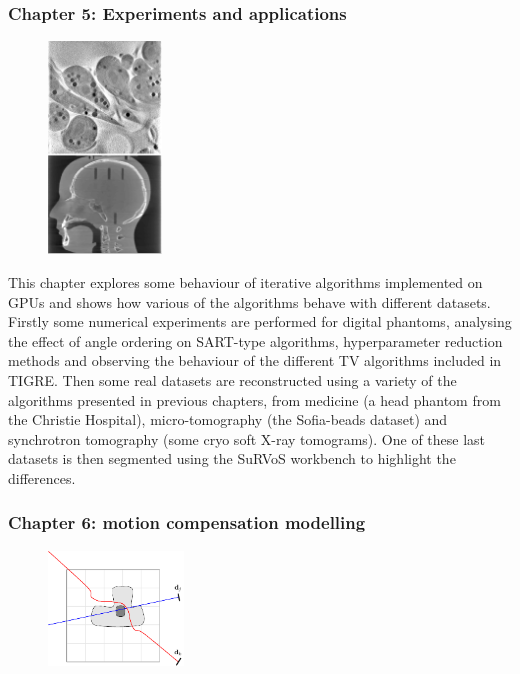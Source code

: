 \newpage
\subsubsection{Chapter 5: Experiments and applications}

\begin{figure}
\centering
\includegraphics[width=0.27\textwidth]{Applications/thumnail.png}
\end{figure}

This chapter explores some behaviour of iterative algorithms implemented on GPUs and shows how various of the algorithms behave with different datasets. Firstly some numerical experiments are performed for digital phantoms, analysing the effect of angle ordering on SART-type algorithms, hyperparameter reduction methods and observing the behaviour of the different TV algorithms included in TIGRE. Then some real datasets are reconstructed using a variety of the algorithms presented in previous chapters, from medicine (a head phantom from the Christie Hospital), micro-tomography (the Sofia-beads dataset) and synchrotron tomography (some cryo soft X-ray tomograms). One of these last datasets is then segmented using the {SuRVoS} workbench to highlight the differences.


\FloatBarrier
\subsubsection{Chapter 6: motion compensation modelling}

\begin{figure}
\centering
\includegraphics[width=0.32\textwidth]{MotionCorrection/diagrammotion1.pdf}
\end{figure}

